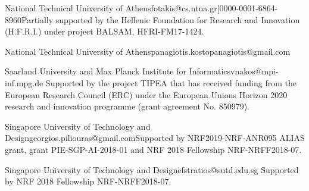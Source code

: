 \author{Dimitris Fotakis}{National Technical University of Athens}{fotakis@cs.ntua.gr}{[0000-0001-6864-8960}{Partially supported by the Hellenic Foundation for Research and Innovation (H.F.R.I.) under 
project BALSAM, HFRI-FM17-1424.}

\author{Panagiotis Kostopanagiotis}{National Technical University of Athens}{panagiotis.kostopanagiotis@gmail.com}{}{}


\author{Vasileios Nakos}{Saarland University and Max Planck Institute for Informatics}{vnakos@mpi-inf.mpg.de}{}{ Supported by the project TIPEA that has
received funding from the European Research Council (ERC) under the European Unions Horizon
2020 research and innovation programme (grant agreement No. 850979).}

\author{Georgios Piliouras}{Singapore University of Technology and Design}{georgios.piliouras@gmail.com}{}{Supported by NRF2019-NRF-ANR095 ALIAS grant, grant
PIE-SGP-AI-2018-01 and NRF 2018 Fellowship NRF-NRFF2018-07.}

\author{Stratis Skoulakis}{Singapore University of Technology and Design}{efstratios@sutd.edu.sg}{}{ Supported by NRF 2018 Fellowship NRF-NRFF2018-07.}




